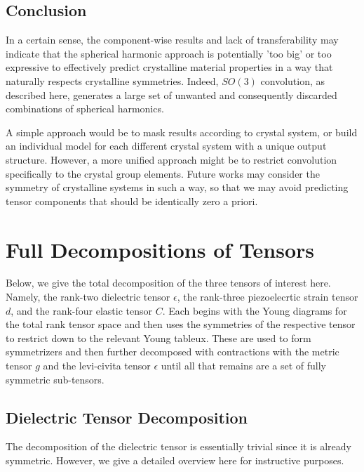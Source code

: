 \documentclass[10pt,a4paper]{article}
\begin{document}
\subsection*{Conclusion}

In a certain sense, the component-wise results and lack of transferability may indicate that the spherical harmonic approach is potentially 'too big' or too expressive to effectively predict crystalline material properties in a way that naturally respects crystalline symmetries. Indeed, $SO(3)$ convolution, as described here, generates a large set of unwanted and consequently discarded combinations of spherical harmonics. 

A simple approach would be to mask results according to crystal system, or build an individual model for each different crystal system with a unique output structure. However, a more unified approach might be to restrict convolution specifically to the crystal group elements. Future works may consider the symmetry of crystalline systems in such a way, so that we may avoid predicting tensor components that should be identically zero a priori. 


\nocite{*}



\appendix



\section{Full Decompositions of Tensors}\label{decomps}
Below, we give the total decomposition of the three tensors of interest here. Namely, the rank-two dielectric tensor $\epsilon$, the rank-three piezoelecrtic strain tensor $d$, and the rank-four elastic tensor $C$. Each begins with the Young diagrams for the total rank tensor space and then uses the symmetries of the respective tensor to restrict down to the relevant Young tableux. These are used to form symmetrizers and then further decomposed with contractions with the metric tensor $g$ and the levi-civita tensor $\epsilon$ until all that remains are a set of fully symmetric sub-tensors.
\subsection{Dielectric Tensor Decomposition}
The decomposition of the dielectric tensor is essentially trivial since it is already symmetric. However, we give a detailed overview here for instructive purposes.
\end{document}
